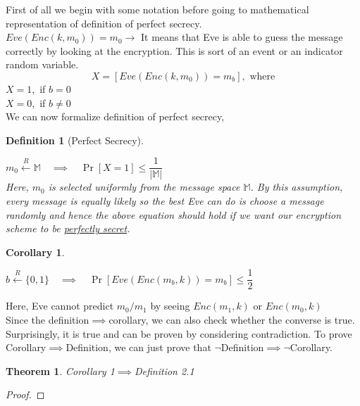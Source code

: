 \documentclass[14pt]{article}
\newtheorem{defn}{Definition}[section]
\newtheorem{coro}{Corollary}
\newtheorem{theorem}{Theorem}
\begin{document}
			
			\noindent
			First of all we begin with some notation before going to mathematical representation of definition of perfect secrecy.\\
			\linebreak
			$Eve(Enc(k, m_0)) = m_0 \rightarrow$ It means that Eve is able to guess the message correctly by looking at the encryption. This is sort of an event or an indicator random variable.\\
			\newpage
			$$X = [Eve(Enc(k, m_0)) = m_b], \text{ where}$$
			\linebreak
			$X = 1,$ if $b = 0$\\
			$X = 0,$ if $b \neq 0$\\
			\linebreak
			We can now formalize definition of perfect secrecy,\\
			\begin{defn}[Perfect Secrecy]
				\label{def}
				\item $m_0 \xleftarrow{R} \mathbb{M}\quad \implies \quad \Pr [X = 1] \leq \dfrac{1}{| \mathbb{M} |}$\\
				\linebreak
				Here, $m_0$ is selected uniformly from the message space $\mathbb{M}$. By this assumption, every message is equally likely so the best Eve can do is choose a message randomly and hence the above equation should hold if we want our encryption scheme to be \underline{perfectly secret}.\\
			\end{defn}
			\begin{coro}
				\label{coro}
				\item $b \xleftarrow{R} \{0, 1\} \quad \implies \quad \Pr [Eve(Enc(m_b, k)) = m_b] \leq \dfrac{1}{2}$
			\end{coro}
			\noindent
			Here, Eve cannot predict $m_0/m_1$ by seeing $Enc(m_1, k)$ or $Enc(m_0, k)$\\
			\linebreak
			Since the definition$\implies$corollary, we can also check whether the converse is true. Surprisingly, it is true and can be proven by considering contradiction. To prove Corollary$\implies$Definition, we can just prove that $\neg$Definition$\implies$$\neg$Corollary. 
			
			\begin{theorem} 
				Corollary 1$\implies$Definition 2.1
			\end{theorem}
			\begin{proof}
				
			\end{proof}
 		
\end{document}
